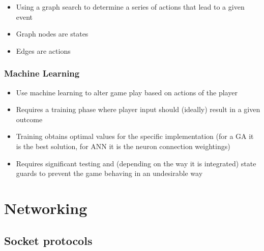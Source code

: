 \documentclass[a4paper]{article}
\begin{document}
\begin{itemize}
  \item
    Using a graph search to determine a series of actions that lead to a given
    event

  \item
    Graph nodes are states

  \item
    Edges are actions

\end{itemize}

\subsubsection{Machine Learning}

\begin{itemize}
  \item
    Use machine learning to alter game play based on actions of the player

  \item
    Requires a training phase where player input should (ideally) result in a
    given outcome

  \item
    Training obtains optimal values for the specific implementation (for a GA it
    is the best solution, for ANN it is the neuron connection weightings)

  \item
    Requires significant testing and (depending on the way it is integrated)
    state guards to prevent the game behaving in an undesirable way

\end{itemize}

\section{Networking}

\subsection{Socket protocols}
\end{document}
